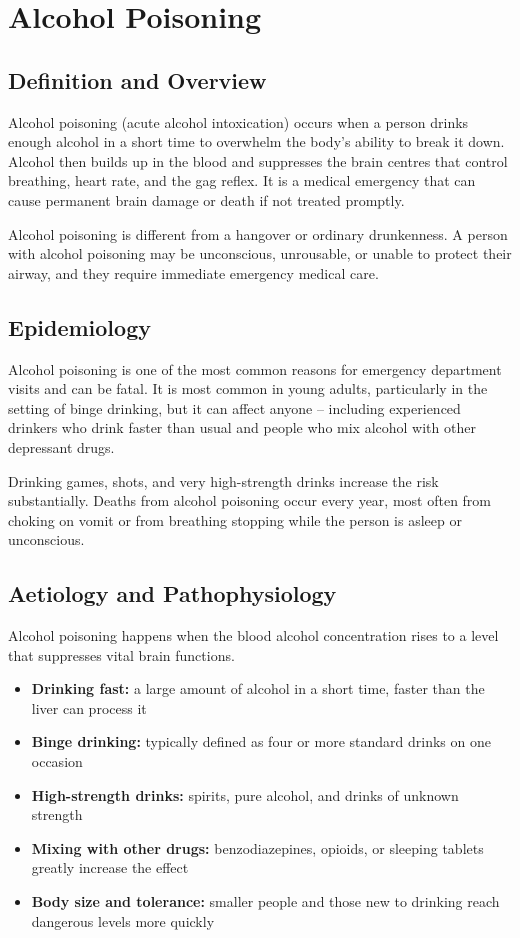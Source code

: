 \chapter{Alcohol Poisoning}

\section*{Definition and Overview}
Alcohol poisoning (acute alcohol intoxication) occurs when a person drinks enough alcohol in a short time to overwhelm the body's ability to break it down. Alcohol then builds up in the blood and suppresses the brain centres that control breathing, heart rate, and the gag reflex. It is a medical emergency that can cause permanent brain damage or death if not treated promptly.

Alcohol poisoning is different from a hangover or ordinary drunkenness. A person with alcohol poisoning may be unconscious, unrousable, or unable to protect their airway, and they require immediate emergency medical care.

\section*{Epidemiology}
Alcohol poisoning is one of the most common reasons for emergency department visits and can be fatal. It is most common in young adults, particularly in the setting of binge drinking, but it can affect anyone -- including experienced drinkers who drink faster than usual and people who mix alcohol with other depressant drugs.

Drinking games, shots, and very high-strength drinks increase the risk substantially. Deaths from alcohol poisoning occur every year, most often from choking on vomit or from breathing stopping while the person is asleep or unconscious.

\section*{Aetiology and Pathophysiology}
Alcohol poisoning happens when the blood alcohol concentration rises to a level that suppresses vital brain functions.

\begin{itemize}
    \item \textbf{Drinking fast:} a large amount of alcohol in a short time, faster than the liver can process it
    \item \textbf{Binge drinking:} typically defined as four or more standard drinks on one occasion
    \item \textbf{High-strength drinks:} spirits, pure alcohol, and drinks of unknown strength
    \item \textbf{Mixing with other drugs:} benzodiazepines, opioids, or sleeping tablets greatly increase the effect
    \item \textbf{Body size and tolerance:} smaller people and those new to drinking reach dangerous levels more quickly
\end{itemize}

